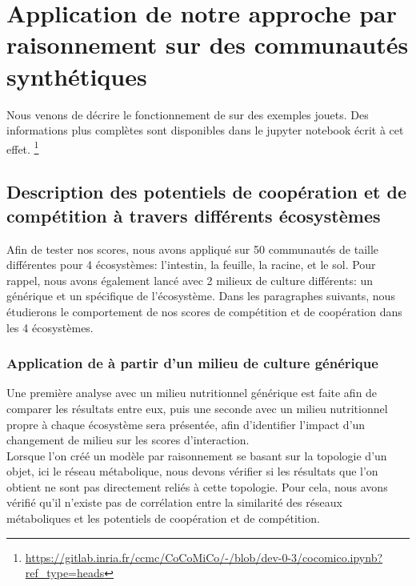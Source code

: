 \documentclass[../main.tex]{subfiles}
\begin{document}
\section{Application de notre approche par raisonnement sur des communautés synthétiques}
Nous venons de décrire le fonctionnement de \ccmc sur des exemples jouets. Des informations plus complètes sont disponibles dans le jupyter notebook écrit à cet effet. \footnote{\url{https://gitlab.inria.fr/ccmc/CoCoMiCo/-/blob/dev-0-3/cocomico.ipynb?ref_type=heads}}


\subsection{Description des potentiels de coopération et de compétition à travers différents écosystèmes}
Afin de tester nos scores, nous avons appliqué \ccmc sur 50 communautés de taille différentes pour 4 écosystèmes: l'intestin, la feuille, la racine, et le sol.  Pour rappel, nous avons également lancé avec 2 milieux de culture différents: un générique et un spécifique de l'écosystème. Dans les paragraphes suivants, nous étudierons le comportement de nos scores de compétition et de coopération dans les 4 écosystèmes.

\subsubsection*{Application de \ccmc à partir d'un milieu de culture générique}
Une première analyse avec un milieu nutritionnel générique est faite afin de comparer les résultats entre eux, puis une seconde avec un milieu nutritionnel propre à chaque écosystème sera présentée, afin d'identifier l'impact d'un changement de milieu sur les scores d'interaction. \\

Lorsque l'on créé un modèle par raisonnement se basant sur la topologie d'un objet, ici le réseau métabolique, nous devons vérifier si les résultats que l'on obtient ne sont pas directement reliés à cette topologie. Pour cela, nous avons vérifié qu’il n’existe pas de corrélation entre la similarité des réseaux métaboliques et les potentiels de coopération et de compétition.
\end{document}
